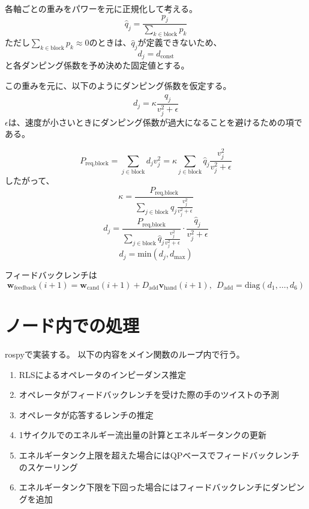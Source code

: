 \documentclass[uplatex]{jsarticle}
\begin{document}
各軸ごとの重みをパワーを元に正規化して考える。
\begin{equation}
  \hat{q}_j = \frac{p_j}{\sum_{k \in \text{block}} p_k}
\end{equation}
ただし$\sum_{k \in \text{block}} p_k \approx 0$のときは、$\hat{q}_j$が定義できないため、
\begin{equation}
  d_j = d_{\text{const}}
\end{equation}
と各ダンピング係数を予め決めた固定値とする。

この重みを元に、以下のようにダンピング係数を仮定する。
\begin{equation}
  d_j = \kappa \frac{\hat{q}_j}{v_j^2 + \epsilon}
\end{equation}
$\epsilon$は、速度が小さいときにダンピング係数が過大になることを避けるための項である。

\begin{equation}
  P_{\text{req,block}} = \sum_{j \in \text{block}} d_j v_j^2 = \kappa \sum_{j \in \text{block}} \hat{q}_j \frac{v_j^2}{v_j^2+\epsilon}
\end{equation}
したがって、
\begin{equation}
  \kappa = \frac{P_{\text{req,block}}}{\sum_{j \in \text{block}} \hat{q}_j \frac{v_j^2}{v_j^2+\epsilon}}
\end{equation}
\begin{equation}
  d_j = \frac{P_{\text{req,block}}}{\sum_{j \in \text{block}} \hat{q}_j \frac{v_j^2}{v_j^2+\epsilon}} \cdot \frac{\hat{q}_j}{v_j^2 + \epsilon}
\end{equation}
\begin{equation}
  d_j = \text{min}(d_j, d_{\text{max}})
\end{equation}

フィードバックレンチは
\begin{equation}
  \bm{w}_{\text{feedback}}(i+1) = \bm{w}_{\text{cand}}(i+1) + D_{\text{add}} \bm{v}_{\text{hand}}(i+1), ~~ D_{\text{add}} = \text{diag}(d_1, \ldots, d_6)
\end{equation}


\section{ノード内での処理}
rospyで実装する。
以下の内容をメイン関数のループ内で行う。
\begin{enumerate}
  \item RLSによるオペレータのインピーダンス推定
  \item オペレータがフィードバックレンチを受けた際の手のツイストの予測
  \item オペレータが応答するレンチの推定
  \item 1サイクルでのエネルギー流出量の計算とエネルギータンクの更新
  \item エネルギータンク上限を超えた場合にはQPベースでフィードバックレンチのスケーリング
  \item エネルギータンク下限を下回った場合にはフィードバックレンチにダンピングを追加
\end{enumerate}
\end{document}

